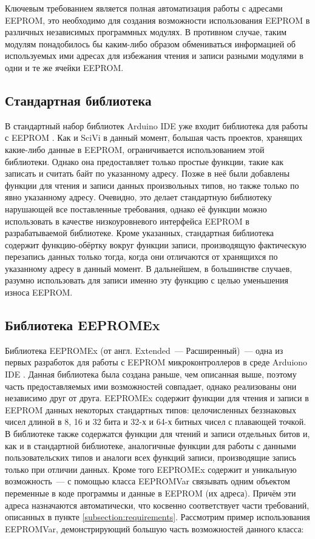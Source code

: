 Ключевым требованием является полная автоматизация работы с адресами EEPROM, это необходимо для создания возможности использования EEPROM в различных независимых программных модулях.
В противном случае, таким модулям понадобилось бы каким-либо образом обмениваться информацией об используемых ими адресах для избежания чтения и записи разными модулями в одни и те же ячейки EEPROM.


\subsection{Стандартная библиотека}

В стандартный набор библиотек Arduino IDE уже входит библиотека для работы с EEPROM \cite{web:arduino-eeprom}.
Как и SciVi в данный момент, большая часть проектов, хранящих какие-либо данные в EEPROM, ограничивается использованием этой библиотеки.
Однако она предоставляет только простые функции, такие как записать и считать байт по указанному адресу.
Позже в неё были добавлены функции для чтения и записи данных произвольных типов, но также только по явно указанному адресу.
Очевидно, это делает стандартную библиотеку нарушающей все поставленные требования, однако её функции можно использовать в качестве низкоуровневого интерфейса EEPROM в разрабатываемой библиотеке.
Кроме указанных, стандартная библиотека содержит функцию-обёртку вокруг функции записи, производящую фактическую перезапись данных только тогда, когда они отличаются от хранящихся по указанному адресу в данный момент.
В дальнейшем, в большинстве случаев, разумно использовать для записи именно эту функцию с целью уменьшения износа EEPROM.


\subsection{Библиотека EEPROMEx}

Библиотека EEPROMEx (от англ. Extended~--- Расширенный)~--- одна из первых разработок для работы с EEPROM микроконтроллеров в среде Arduiono IDE \cite{web:eepromex}.
Данная библиотека была создана раньше, чем описанная выше, поэтому часть предоставляемых ими возможностей совпадает, однако реализованы они независимо друг от друга.
EEPROMEx содержит функции для чтения и записи в EEPROM данных некоторых стандартных типов: целочисленных беззнаковых чисел длиной в 8, 16 и 32 бита и 32-х и 64-х битных чисел с плавающей точкой.
В библиотеке также содержатся функции для чтений и записи отдельных битов и, как и в стандартной библиотеке, аналогичные функции для работы с данными пользовательских типов и аналоги всех функций записи, производящие запись только при отличии данных.
Кроме того EEPROMEx содержит и уникальную возможность~--- с помощью класса EEPROMVar связывать одним объектом переменные в коде программы и данные в EEPROM (их адреса).
Причём эти адреса назначаются автоматически, что косвенно соответствует части требований, описанных в пункте \ref{subsection:requirements}.
Рассмотрим пример использования EEPROMVar, демонстрирующий большую часть возможностей данного класса:

